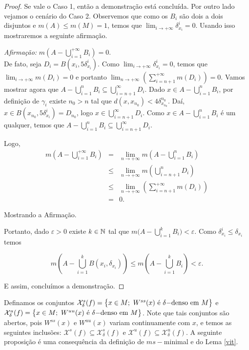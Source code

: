 \begin{proof}
Se vale o Caso 1, então a demonstração está concluída. Por outro lado vejamos o cenário do Caso 2. Observemos que como os $B_i$ são dois a dois disjuntos e $m(A)\leq m(M)=1$, temos que $\displaystyle\lim_{i\to+\infty}\delta_{x_i}^i=0$. Usando isso mostraremos a seguinte afirmação.

\textit{Afirmação:} $\displaystyle m\left(A-\bigcup_{i=1}^{+\infty}B_i\right)=0$.\\

De fato, seja $D_i=B(x_i,5\delta_{x_i}^i)$. Como $\displaystyle\lim_{i\to+\infty}\delta_{x_i}^i=0$, temos que $\displaystyle\lim_{i\to+\infty}m(D_i)=0$ e portanto $\displaystyle\lim_{n\to+\infty}\left(\sum_{i=n+1}^{+\infty}m(D_i)\right)=0$. Vamos mostrar agora que $A-\bigcup_{i=1}^{n}B_i\subseteq\bigcup_{i=n+1}^{\infty}D_i$. Dado $x\in A-\bigcup_{i=1}^{n}B_i$, por definição de $\gamma_i$ existe $n_0>n$ tal que $d(x,x_{n_0})<4\delta_{x_{n_0}}^{n_0}$. Daí, $x\in B(x_{n_0},5\delta_{x_i}^i)=D_{n_0}$, logo $x\in \bigcup_{i=n+1}^{\infty}D_i$. Como $x\in A-\bigcup_{i=1}^{n}B_i$ é um qualquer, temos que $A-\bigcup_{i=1}^{n}B_i\subseteq\bigcup_{i=n+1}^{\infty}D_i$.

Logo, 
\begin{eqnarray*}
m\left(A-\bigcup_{i=1}^{+\infty}B_i\right) & = & \lim_{n\to+\infty}m\left(A-\bigcup_{i=1}^{n}B_i\right)\\
&\leq & \lim_{n\to+\infty}m\left(\bigcup_{i=n+1}^{n}D_i\right)\\
& \leq & \lim_{n\to+\infty}\left(\sum_{i=n+1}^{+\infty}m(D_i)\right)\\
& = & 0.
\end{eqnarray*}

Mostrando a Afirmação.

Portanto, dado $\varepsilon>0$ existe $k\in\mathbb{N}$ tal que $m\big(A-\bigcup_{i=1}^{k}B_i\big)<\varepsilon$. Como $\delta_{x_i}^i\leq\delta_{x_i}$ temos 

\begin{equation*}
m\left(A-\bigcup_{i=1}^{k}B(x_i,\delta_{x_i})\right)\leq m\left(A-\bigcup_{i=1}^{k}B_i\right)<\varepsilon.
\end{equation*}

E assim, concluímos a demonstração.
\end{proof}

Definamos os conjuntos $\mathcal{X}^s_{\delta}(f)=\conjunto{x\in M;\ W^{ss}(x) \text{ é $\delta-$denso em $M$}}$ e $\mathcal{X}^u_{\delta}(f)=\conjunto{x\in M;\ W^{uu}(x) \text{ é $\delta-$denso em $M$}}$. Note que tais conjuntos são abertos, pois $W^{ss}(x)$ e $W^{uu}(x)$ variam continuamente com $x$, e temos as seguintes inclusões: $\mathcal{X}^s(f)\subseteq \mathcal{X}^s_{\delta}(f)$ e $\mathcal{X}^u(f)\subseteq \mathcal{X}^u_{\delta}(f)$. A seguinte proposição é uma consequência da definição de $ms-$minimal e do Lema \ref{vit}.

